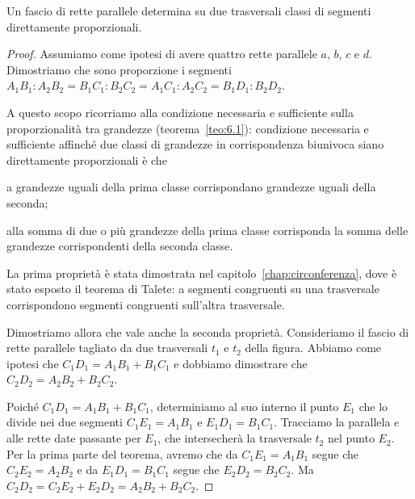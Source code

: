 \begin{teorema}[di Talete]
Un fascio di rette parallele determina su due trasversali classi di 
segmenti direttamente proporzionali.
\end{teorema}

\begin{proof}
Assumiamo come ipotesi di avere quattro rette parallele \(a\), \(b\), \(c\) 
e \(d\). Dimostriamo che sono proporzione i segmenti 
\(A_1B_1 : A_2B_2 = B_1C_1 : B_2C_2 = A_1C_1 : A_2C_2 = B_1D_1 : 
B_2D_2\).

\begin{figure*}[!htb]
	\centering	
\end{figure*}

A questo scopo ricorriamo alla condizione necessaria e sufficiente 
sulla proporzionalità tra grandezze (teorema~\ref{teo:6.1}):
condizione necessaria e sufficiente affinché due classi di grandezze 
in corrispondenza biunivoca siano direttamente proporzionali è che
\begin{itemize*}
\item a grandezze uguali della prima classe corrispondano grandezze 
uguali della seconda;
\item alla somma di due o più grandezze della prima classe 
corrisponda la somma delle grandezze corrispondenti della seconda 
classe.
\end{itemize*}

La prima proprietà è stata dimostrata nel 
capitolo~\ref{chap:circonferenza}, dove è stato esposto il teorema di 
Talete: a segmenti congruenti su una trasversale corrispondono 
segmenti congruenti sull'altra trasversale.

Dimostriamo allora che vale anche la seconda proprietà.
Consideriamo il fascio di rette parallele tagliato da due trasversali 
\(t_1\) e \(t_2\) della figura.
Abbiamo come ipotesi che \(C_1D_1 = A_1B_1 + B_1C_1\) e dobbiamo 
dimostrare che \(C_2D_2 = A_2B_2 + B_2C_2\).

Poiché \(C_1D_1 = A_1B_1 + B_1C_1\), determiniamo al suo interno il 
punto \(E_1\) che lo divide nei due segmenti \(C_1E_1=A_1B_1\) e 
\(E_1D_1=B_1C_1\). Tracciamo la parallela \(e\) alle rette date passante 
per \(E_1\), che intersecherà la trasversale \(t_2\) nel punto \(E_2\). Per 
la prima parte del teorema, avremo che da \(C_1E_1=A_1B_1\) segue che 
\(C_2E_2 = A_2B_2\) e da \(E_1D_1 = B_1C_1\) segue che \(E_2D_2=B_2C_2\). 
Ma \(C_2D_2=C_2E_2 + E_2D_2 = A_2B_2 + B_2C_2\).
\end{proof}

